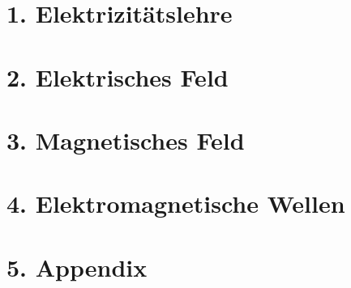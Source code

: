 \documentclass{cheatsheet}
\author{Noa Sendlhofer \& Christian Leser \\ nsendlhofer \& cleser \\ \vspace*{-0.2em}}
\begin{document}
\section{1. Elektrizitätslehre}
    
    
    
    
    
    

\section{2. Elektrisches Feld}
    
    
    
    
    

\section{3. Magnetisches Feld}
    
    
    
    
    
    
    
    
    
    
    
    

\section{4. Elektromagnetische Wellen}
    
     
    
    
    

\section{5. Appendix}
    
\end{document}
